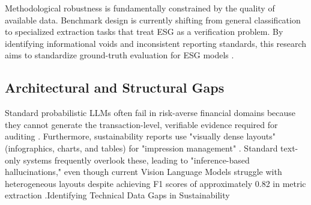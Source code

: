 Methodological robustness is fundamentally constrained by the quality of available data. Benchmark design is currently shifting from general classification to specialized extraction tasks that treat ESG as a verification problem. By identifying informational voids and inconsistent reporting standards, this research aims to standardize ground-truth evaluation for ESG models  \parencite[]{tobias_schimanski_3549ff9f, tobias_schimanski_241ada20}.
\subsection{Architectural and Structural Gaps}

Standard probabilistic LLMs often fail in risk-averse financial domains because they cannot generate the transaction-level, verifiable evidence required for auditing  \parencite{steven_paul_nohr_a6874924}. Furthermore, sustainability reports use "visually dense layouts" (infographics, charts, and tables) for "impression management"  \parencite{bingjie_li_487d69fd}. Standard text-only systems frequently overlook these, leading to "inference-based hallucinations," even though current Vision Language Models struggle with heterogeneous layouts despite achieving F1 scores of approximately 0.82 in metric extraction  \parencite[]{g_saipooja_m_n_488bfdd6, lars_wilhelmi_8d7e860b, tanay_gupta_aafe0c6a}.Identifying Technical Data Gaps in Sustainability

